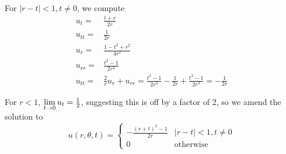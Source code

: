 For $|r - t| < 1, t \neq 0$, we compute
\begin{align*}
  u_t = &\frac{t + r}{2 r}\\
  u_{tt} = &\frac{1}{2 r}\\
  u_r = &\frac{1 - t^2 + r^2}{4 r^2}\\
  u_{rr} = &\frac{t^2 - 1}{2 r^3}\\
  u_{tt} = &\frac{2}{r} u_r + u_{rr} = \frac{t^2 - 1}{2 r^3} - \frac{1}{2 r} + \frac{t^2 - 1}{2 r^3} = -\frac{1}{2 r}
\end{align*}

For $r < 1$, $\lim \limits_{t \rightarrow 0} u_t = \frac{1}{2}$, suggesting this is off by a factor of 2, so we amend the solution to
$$
u(r, \theta, t) =
\begin{cases}
  -\frac{(r + t)^2 - 1}{2 r} & |r - t| < 1, t \neq 0\\
  0 & \text{otherwise}
\end{cases}
$$
